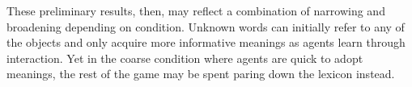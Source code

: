These preliminary results, then, may reflect a combination of narrowing and broadening depending on condition. Unknown words can initially refer to any of the objects and only acquire more informative meanings as agents learn through interaction. Yet in the coarse condition where agents are quick to adopt meanings, the rest of the game may be spent paring down the lexicon instead.








